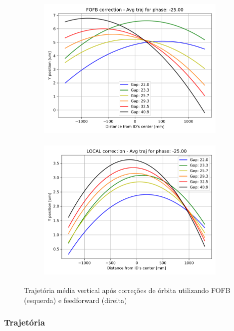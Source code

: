 \documentclass[a4paper,12pt]{article}
\begin{document}
\begin{figure}[H]
\begin{subfigure}{0.5\textwidth}
\includegraphics[width=0.9\linewidth, height=7cm]{figs/phase-25 vertical-avg-traj-FOFB.png} 
\label{fig:subim10yc25}
\end{subfigure}
\begin{subfigure}{0.5\textwidth}
\includegraphics[width=0.9\linewidth, height=7cm]{figs/phase-25 vertical-avg-traj-LOCAL.png}
\label{fig:subim20yc25}
\end{subfigure}
\caption{Trajetória média vertical após correções de órbita utilizando FOFB (esquerda) e feedforward (direita)}
\label{fig:-25corry}
\end{figure}


\subsubsection{Trajetória}
\end{document}
